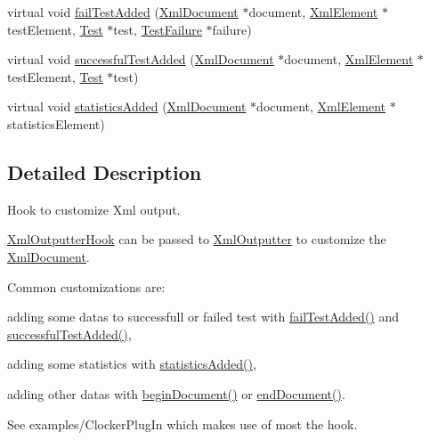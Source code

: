 \begin{DoxyCompactItemize}
\item 
virtual void \hyperlink{class_xml_outputter_hook_a77310985e055cc2c67e91a42c524fbbe}{fail\+Test\+Added} (\hyperlink{class_xml_document}{Xml\+Document} $\ast$document, \hyperlink{class_xml_element}{Xml\+Element} $\ast$test\+Element, \hyperlink{class_test}{Test} $\ast$test, \hyperlink{class_test_failure}{Test\+Failure} $\ast$failure)
\item 
virtual void \hyperlink{class_xml_outputter_hook_adbcf6ad2cb85d6f1015306fadb7eadcf}{successful\+Test\+Added} (\hyperlink{class_xml_document}{Xml\+Document} $\ast$document, \hyperlink{class_xml_element}{Xml\+Element} $\ast$test\+Element, \hyperlink{class_test}{Test} $\ast$test)
\item 
virtual void \hyperlink{class_xml_outputter_hook_a0e602260274d4f005affb4ee84ce4c4a}{statistics\+Added} (\hyperlink{class_xml_document}{Xml\+Document} $\ast$document, \hyperlink{class_xml_element}{Xml\+Element} $\ast$statistics\+Element)
\end{DoxyCompactItemize}


\subsection{Detailed Description}
Hook to customize Xml output. 

\hyperlink{class_xml_outputter_hook}{Xml\+Outputter\+Hook} can be passed to \hyperlink{class_xml_outputter}{Xml\+Outputter} to customize the \hyperlink{class_xml_document}{Xml\+Document}.

Common customizations are\+:
\begin{DoxyItemize}
\item adding some datas to successfull or failed test with \hyperlink{class_xml_outputter_hook_aba4c8b38c5a96e5bf4e3a60303169581}{fail\+Test\+Added()} and \hyperlink{class_xml_outputter_hook_aa50aa698854c504b7f86b4a14bfabe4d}{successful\+Test\+Added()},
\item adding some statistics with \hyperlink{class_xml_outputter_hook_a62de92c797907f3ae927a41a587539d9}{statistics\+Added()},
\item adding other datas with \hyperlink{class_xml_outputter_hook_a35d3cc333991efbf9a6365fefc93ed46}{begin\+Document()} or \hyperlink{class_xml_outputter_hook_afa02a81666ef87974cabc94981724000}{end\+Document()}.
\end{DoxyItemize}

See examples/\+Clocker\+Plug\+In which makes use of most the hook.


